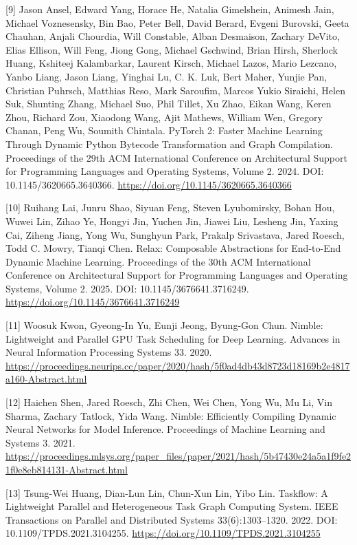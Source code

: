 \documentclass[UTF8,11pt,fontset=windows]{ctexart}
\begin{document}
\leavevmode{}%
{[}9{]} Jason Ansel, Edward Yang, Horace He, Natalia Gimelshein, Animesh Jain, Michael Voznesensky, Bin Bao, Peter Bell, David Berard, Evgeni Burovski, Geeta Chauhan, Anjali Chourdia, Will Constable, Alban Desmaison, Zachary DeVito, Elias Ellison, Will Feng, Jiong Gong, Michael Gschwind, Brian Hirsh, Sherlock Huang, Kshiteej Kalambarkar, Laurent Kirsch, Michael Lazos, Mario Lezcano, Yanbo Liang, Jason Liang, Yinghai Lu, C. K. Luk, Bert Maher, Yunjie Pan, Christian Puhrsch, Matthias Reso, Mark Saroufim, Marcos Yukio Siraichi, Helen Suk, Shunting Zhang, Michael Suo, Phil Tillet, Xu Zhao, Eikan Wang, Keren Zhou, Richard Zou, Xiaodong Wang, Ajit Mathews, William Wen, Gregory Chanan, Peng Wu, Soumith Chintala. PyTorch 2: Faster Machine Learning Through Dynamic Python Bytecode Transformation and Graph Compilation. Proceedings of the 29th ACM International Conference on Architectural Support for Programming Languages and Operating Systems, Volume 2. 2024. DOI: 10.1145/3620665.3640366. \url{https://doi.org/10.1145/3620665.3640366}

\leavevmode{}%
{[}10{]} Ruihang Lai, Junru Shao, Siyuan Feng, Steven Lyubomirsky, Bohan Hou, Wuwei Lin, Zihao Ye, Hongyi Jin, Yuchen Jin, Jiawei Liu, Lesheng Jin, Yaxing Cai, Ziheng Jiang, Yong Wu, Sunghyun Park, Prakalp Srivastava, Jared Roesch, Todd C. Mowry, Tianqi Chen. Relax: Composable Abstractions for End-to-End Dynamic Machine Learning. Proceedings of the 30th ACM International Conference on Architectural Support for Programming Languages and Operating Systems, Volume 2. 2025. DOI: 10.1145/3676641.3716249. \url{https://doi.org/10.1145/3676641.3716249}

\leavevmode{}%
{[}11{]} Woosuk Kwon, Gyeong-In Yu, Eunji Jeong, Byung-Gon Chun. Nimble: Lightweight and Parallel GPU Task Scheduling for Deep Learning. Advances in Neural Information Processing Systems 33. 2020. \url{https://proceedings.neurips.cc/paper/2020/hash/5f0ad4db43d8723d18169b2e4817a160-Abstract.html}

\leavevmode{}%
{[}12{]} Haichen Shen, Jared Roesch, Zhi Chen, Wei Chen, Yong Wu, Mu Li, Vin Sharma, Zachary Tatlock, Yida Wang. Nimble: Efficiently Compiling Dynamic Neural Networks for Model Inference. Proceedings of Machine Learning and Systems 3. 2021. \url{https://proceedings.mlsys.org/paper_files/paper/2021/hash/5b47430e24a5a1f9fe21f0e8eb814131-Abstract.html}

\leavevmode{}%
{[}13{]} Tsung-Wei Huang, Dian-Lun Lin, Chun-Xun Lin, Yibo Lin. Taskflow: A Lightweight Parallel and Heterogeneous Task Graph Computing System. IEEE Transactions on Parallel and Distributed Systems 33(6):1303--1320. 2022. DOI: 10.1109/TPDS.2021.3104255. \url{https://doi.org/10.1109/TPDS.2021.3104255}
\end{document}
